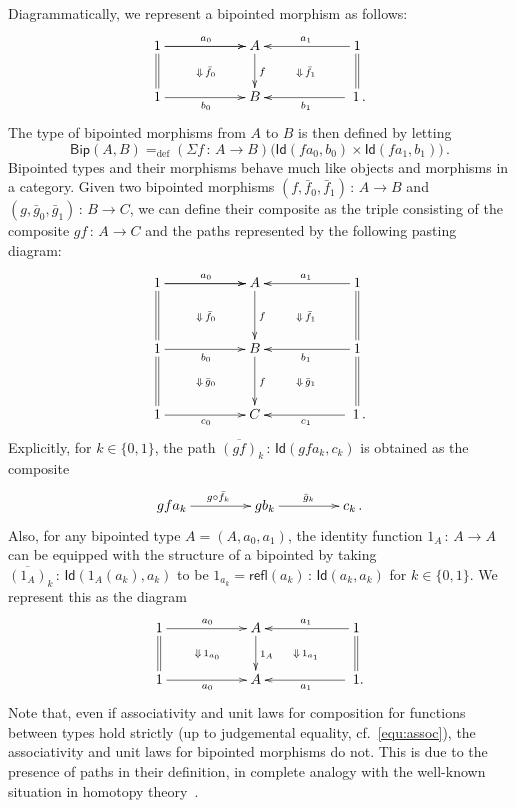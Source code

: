 \documentclass[10pt,a4paper,oneside,reqno]{amsart}
\numberwithin{equation}{section}
\theoremstyle{mythm}
\theoremstyle{mydef}
\theoremstyle{myrmk}
\newcommand{\ie}{\text{i.e.\ }}
\newcommand{\defeq}{=_{\mathrm{def}}}
\newcommand{\co}{\,{:}\,}
\newcommand{\Id}{\mathsf{Id}}
\newcommand{\refl}{\mathsf{refl}}
\newcommand{\BipHom}{\mathsf{Bip}}
\begin{document}
Diagrammatically, we represent a bipointed morphism as follows:
\begin{equation}
\label{equ:bipmor}
\vcenter{\hbox{\xymatrix@C=2cm{
1 \ar[r]   \ar[r]^{a_0} \ar@{=}[d]  \ar@{}[dr]|{\Downarrow \, \bar{f}_0} & A  \ar[d]^{f} & 1  \ar[l]_{a_1} \ar@{=}[d] \ar@{}[dl]|{\Downarrow \,  \bar{f}_1} \\
1 \ar[r]_{b_0}  & B   & \; 1 \, . \ar[l]^{b_1} }}}
 \end{equation}
The type of bipointed morphisms from $A$ to $B$ is then defined by letting
\[
\BipHom(A,B) \defeq (\Sigma f \co A \to B) \big( \Id(  f a_0, b_0 )  \times \Id(  f a_1 , b_1 )  \big) \, .
\]
 Bipointed types and their morphisms behave much like objects and morphisms in a category.
Given two bipointed morphisms  $(f, \bar{f}_0, \bar{f}_1) \co A \to B$ and $(g, \bar{g}_0, \bar{g}_1) \co B \to C$, we can define their composite 
 as the triple consisting of the composite $g  f \co A \to C$ and the paths represented
by the following pasting diagram:
\[
\xymatrix@C=2cm@R=1.2cm{
1 \ar[r]   \ar[r]^{a_0} \ar@{=}[d]  \ar@{}[dr]|{\Downarrow \, \bar{f}_0} & A  \ar[d]^{f} & 1  \ar[l]_{a_1} \ar@{=}[d] \ar@{}[dl]|{\Downarrow \,  \bar{f}_1} \\
1 \ar[r]_{b_0}   \ar@{}[dr]|{\Downarrow \, \bar{g}_0}  \ar@{=}[d] & B \ar[d]^f   & 1 \ar[l]^{b_1} \ar@{=}[d] \ar@{}[dl]|{\Downarrow \,  \bar{g}_1} \\
1 \ar[r]_{c_0}  & C   & \; 1 \, .\ar[l]^{c_1}}
 \]
Explicitly, for $k \in \{ 0, 1 \}$, the path $\overline{(g  f)}_k \co \Id( g f a_k, c_k)$ is obtained as the composite
\[
\xymatrix@C=1.5cm{
g f a_k \ar[r]^{g \circ \bar{f}_k} & g b_k \ar[r]^{\bar{g}_k} & c_k \, .}
\]
Also, for any bipointed type $A = (A, a_0, a_1)$, the identity function $1_A \co A \to A$ can be equipped with the structure of a bipointed by taking $\overline{(1_A)}_k \co \Id( 1_A(a_k), a_k)$ to be $1_{a_k} = \refl(a_k) \co \Id(a_k, a_k)$ for $k \in \{ 0, 1\}$. We represent this as the
diagram
 \begin{equation}
 \label{equ:bipidA}
{\vcenter{\hbox{\xymatrix@C=2cm{
1 \ar[r]^{a_0} \ar@{=}[d] \ar@{}[dr]|{\Downarrow \, 1_{a_0}}& A \ar[d]^{1_A} & 
1 \ar[l]_{a_1} \ar@{=}[d]  \ar@{}[dl]|{\Downarrow \, 1_{a_1}}  \\ 
 1 \ar[r]_{a_0} & A & \; 1 .\ar[l]^{a_1} }}}}
 \end{equation}
 Note that, even if associativity and unit laws for composition for functions between types hold strictly
 (\ie up to judgemental equality, {cf.}~\eqref{equ:assoc}), the  associativity and unit laws for bipointed morphisms do not. This
 is due to the presence of paths in their definition, in complete analogy with the well-known situation
 in homotopy theory~\cite{BoardmanM:homiast}. 
\end{document}
